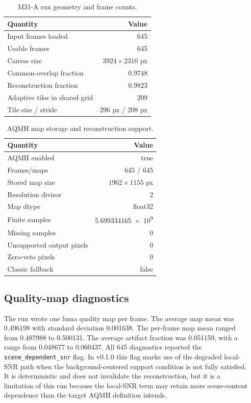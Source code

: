 \documentclass[10pt,twocolumn]{article}
\begin{document}
\begin{table}[t]
\centering
\caption{M31-A run geometry and frame counts.}
\begin{tabular}{lr}
\toprule
Quantity & Value \\
\midrule
Input frames loaded & 645 \\
Usable frames & 645 \\
Canvas size & $3924\times2310$ px \\
Common-overlap fraction & \num{0.9748} \\
Reconstruction fraction & \num{0.9823} \\
Adaptive tiles in shared grid & 209 \\
Tile size / stride & 296 px / 208 px \\
\bottomrule
\end{tabular}
\label{tab:geometry}
\end{table}

\begin{table}[t]
\centering
\caption{AQMH map storage and reconstruction support.}
{\small
\begin{tabular}{@{}lr@{}}
\toprule
Quantity & Value \\
\midrule
AQMH enabled & true \\
Frames/maps & 645 / 645 \\
Stored map size & $1962\times1155$ px \\
Resolution divisor & 2 \\
Map dtype & float32 \\
Finite samples & \num{5.699334165e9} \\
Missing samples & 0 \\
Unsupported output pixels & 0 \\
Zero-veto pixels & 0 \\
Classic fallback & false \\
\bottomrule
\end{tabular}
}
\label{tab:support}
\end{table}

\subsection{Quality-map diagnostics}

The run wrote one luma quality map per frame. The average map mean was
\num{0.496198} with standard deviation \num{0.001638}. The per-frame map mean ranged from
\num{0.487988} to \num{0.500131}. The average artifact fraction was \num{0.051159}, with a
range from \num{0.048677} to \num{0.060437}. All 645 diagnostics reported the
\texttt{scene\_dependent\_snr} flag. In v0.1.0 this flag marks use of the degraded local-SNR path
when the background-centered support condition is not fully satisfied. It is deterministic and
does not invalidate the reconstruction, but it is a limitation of this run because the local-SNR
term may retain more scene-content dependence than the target AQMH definition intends.
\end{document}

